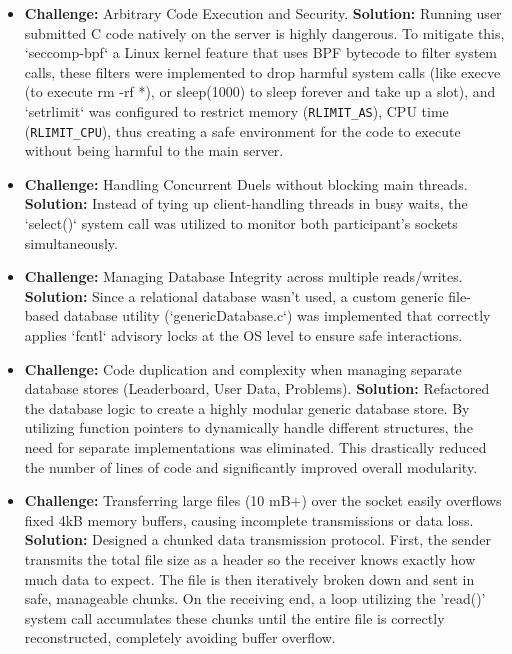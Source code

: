 \documentclass[12pt,a4paper]{article}
\begin{document}
\begin{itemize}
    \item \textbf{Challenge:} Arbitrary Code Execution and Security. \newline
    \textbf{Solution:} Running user submitted C code natively on the server is highly dangerous. To mitigate this, `seccomp-bpf` a Linux kernel feature that uses BPF bytecode to filter system calls, these filters were implemented to drop harmful system calls (like execve (to execute rm -rf *), or sleep(1000) to sleep forever and take up a slot), and `setrlimit` was configured to restrict memory (\texttt{RLIMIT\_AS}), CPU time (\texttt{RLIMIT\_CPU}), thus creating a safe environment for the code to execute without being harmful to the main server.
    
    \item \textbf{Challenge:} Handling Concurrent Duels without blocking main threads.\newline
    \textbf{Solution:} Instead of tying up client-handling threads in busy waits, the `select()` system call was utilized to monitor both participant's sockets simultaneously.
    
    \item \textbf{Challenge:} Managing Database Integrity across multiple reads/writes.\newline
    \textbf{Solution:} Since a relational database wasn't used, a custom generic file-based database utility (`genericDatabase.c`) was implemented that correctly applies `fcntl` advisory locks at the OS level to ensure safe interactions.
    
    \item \textbf{Challenge:} Code duplication and complexity when managing separate database stores (Leaderboard, User Data, Problems). \newline
    \textbf{Solution:} Refactored the database logic to create a highly modular generic database store. By utilizing function pointers to dynamically handle different structures, the need for separate implementations was eliminated. This drastically reduced the number of lines of code and significantly improved overall modularity.

    \item \textbf{Challenge:} Transferring large files (10 mB+) over the socket easily overflows fixed 4kB memory buffers, causing incomplete transmissions or data loss. \newline
    \textbf{Solution:} Designed a chunked data transmission protocol. First, the sender transmits the total file size as a header so the receiver knows exactly how much data to expect. The file is then iteratively broken down and sent in safe, manageable chunks. On the receiving end, a loop utilizing the 'read()' system call accumulates these chunks until the entire file is correctly reconstructed, completely avoiding buffer overflow.
    
\end{itemize}
\end{document}
